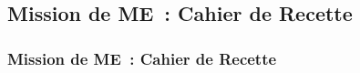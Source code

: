 \subsection{Mission de ME~: Cahier de Recette}
\begin{frame}
	\frametitle{Mission de ME~: Cahier de Recette}
\end{frame}


